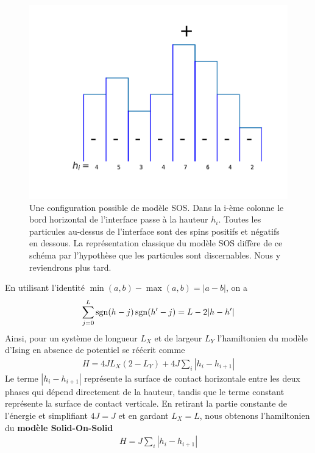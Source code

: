 \begin{figure}
	\centering
	\includegraphics[scale=1]{isingtosos/sos-indiscernable.pdf}
	\caption{Une configuration possible de modèle SOS. Dans la i-ème colonne le bord horizontal de l'interface passe à la hauteur $h_i$. Toutes les particules au-dessus de l'interface sont des spins positifs et négatifs en dessous. La représentation classique du modèle SOS diffère de ce schéma par l'hypothèse que les particules sont discernables. Nous y reviendrons plus tard.}
\end{figure}


En utilisant l'identité $\min(a,b)-\max(a,b)=|a-b|$, on a
\begin{align*}
    \sum_{j=0}^L \operatorname{sgn}(h-j)\operatorname{sgn}(h'-j) = L - 2 |h-h'|
\end{align*}
Ainsi, pour un système de longueur $L_X$ et de largeur $L_Y$ l'hamiltonien du modèle d'Ising en absence de potentiel se réécrit comme 
\begin{align}
    H = 4 J L_X (2-L_Y) +4J \sum_i |h_i-h_{i+1}|
\end{align}
Le terme $|h_i-h_{i+1}|$ représente la surface de contact horizontale entre les deux phases qui dépend directement de la hauteur, tandis que le terme constant représente la surface de contact verticale.
En retirant la partie constante de l'énergie et simplifiant $4 J = J$ et en gardant $L_X = L$, nous obtenons l'hamiltonien du \textbf{modèle Solid-On-Solid}
\begin{align}
    H = J \sum_i |h_i-h_{i+1}|
    \label{hamil-sos}
\end{align}

